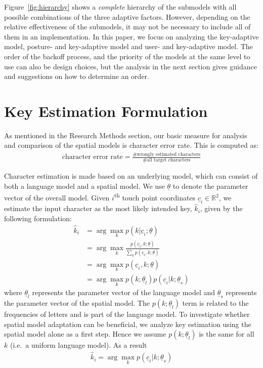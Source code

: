 \documentclass{sigchi}
\begin{document}
Figure~\ref{fig:hierarchy} shows a \textit{complete} hierarchy of the submodels with all
possible combinations of the three adaptive factors. However, depending on the
relative effectiveness of the submodels, it may not be necessary to include all of
them in an implementation. In this paper, we focus on analyzing the key-adaptive model, posture- and key-adaptive model and user- and key-adaptive model.
The order of the backoff process, and the priority of the models at the same level to use can
also be design choices, but the analysis in the next section gives
guidance and suggestions on how to determine an order.

\section{Key Estimation Formulation}\label{sec:formulation}
As mentioned in the Research Methods section, our basic measure for analysis and comparison of the spatial models is character error rate. This is computed as:
\begin{align}
\text{character error rate} = \frac{\text{\# wrongly estimated
characters}}{\text{\# all target characters}}
\end{align}

Character estimation is made based on an underlying model, which can consist of
both a language model and a spatial model.
We use $\underline\theta$ to denote the parameter vector of the overall model. Given
$i$\textsuperscript{th} touch point coordinates $\underline c_i \in \mathbb{R}^2$, we estimate the input character as the most likely intended key, $\hat k_i$,  given by the following formulation:
\begin{align}
\hat k_i &= \arg\max_k p(k | \underline c_i; \underline \theta) \\
          &= \arg\max_k \frac{p(\underline c_i, k; \underline \theta)}{\sum_k p(\underline c_i, k; \underline \theta)} \\
          &= \arg\max_k p(\underline c_i, k; \underline \theta) \\
          &= \arg\max_k p(k;\underline\theta_l)p(\underline c_i | k; \underline \theta_s) \label{eq:likely-k}
\end{align}
where $\underline\theta_l$ represents the parameter vector of the language model and $\underline\theta_s$ represents the parameter vector of the spatial model. The $p(k;\underline\theta_l)$ term is related to the frequencies of letters and is part of the language model. To investigate whether spatial model adaptation can be beneficial, we analyze key estimation using the spatial model alone as a first step. Hence we assume $p(k; \underline\theta_l)$ is the same for all $k$ (i.e.\ a uniform language model). As a result
\begin{align}
\hat k_i = \arg\max_k p(\underline c_i | k; \underline \theta_s)
\end{align}
\end{document}
